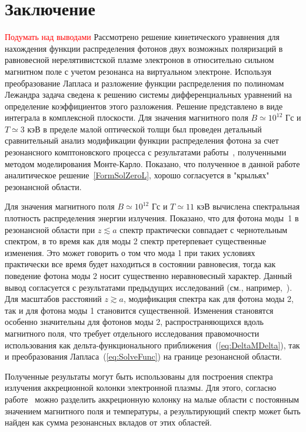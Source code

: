 \documentclass[14pt, russian]{article}
\begin{document}
\section{Заключение}
\textcolor{red}{Подумать над выводами}
Рассмотрено решение кинетического уравнения для нахождения функции распределения фотонов двух возможных поляризаций в равновесной нерелятивистской плазме электронов в относительно сильном магнитном поле с учетом резонанса на виртуальном электроне.
Используя преобразование Лапласа и разложение функции распределения по полиномам Лежандра задача сведена к решению системы дифференциальных уравнений на определение коэффициентов этого разложения. Решение представлено в виде интеграла в комплексной плоскости.
Для значения магнитного поля $B\simeq10^{12}$ Гс и $T\simeq3$ кэВ в пределе малой оптической толщи был проведен детальный сравнительный анализ модификации функции распределения фотона за счет резонансного комптоновского процесса с результатами работы~\cite{Schonherr:2007}, полученными методом моделирования Монте-Карло. Показано, что полученное в данной работе аналитическое решение~\ref{FormSolZeroL}, хорошо согласуется в "крыльях" резонансной области.
 
 Для значения магнитного поля $B\simeq10^{12}$ Гс и $T\simeq11$ кэВ вычислена спектральная плотность распределения энергии излучения. Показано, что для фотона моды~1 в резонансной области при $z\lesssim a$ спектр практически совпадает с чернотельным спектром, в то время как для моды 2 спектр претерпевает существенные изменения. Это может говорить о том что мода 1 при таких условиях практически все время будет находиться в состоянии равновесия, тогда как поведение фотона моды 2 носит существенно неравновесный характер. Данный вывод согласуется с результатами предыдущих исследований (см., например,~\cite{Lubarsky:1988}). Для масштабов расстояний $z\gtrsim a$, модификация спектра как для фотона моды 2, так и для фотона моды 1 становится существенной. Изменения становятся особенно значительны для фотонов моды 2, распространяющихся вдоль магнитного поля, что требует отдельного исследования правомочности использования как дельта-функционального приближения~(\ref{eq:DeltaMDelta}), так и преобразования Лапласа~(\ref{eq:SolveFunc}) на границе резонансной области.

Полученные результаты могут быть использованы для построения спектра излучения аккреционной колонки электронной плазмы. Для этого, согласно работе~\cite{Nishimura:2008} можно разделить аккреционную колонку на малые области с постоянным значением магнитного поля и температуры, а результирующий спектр может быть найден как сумма резонансных вкладов от этих областей.
\end{document}
